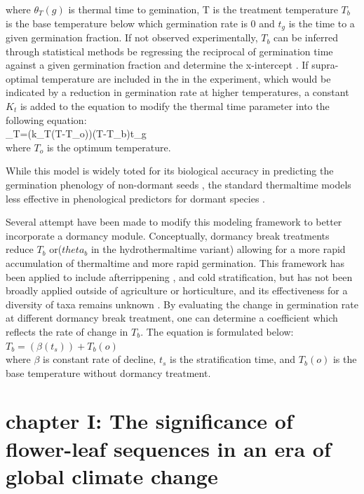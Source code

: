 \documentclass{article}\usepackage[]{graphicx}\usepackage[]{color}
\begin{document}
where $\theta_{T}(g)$ is thermal time to gemination, T is the treatment temperature $T_b$ is the base temperature below which germination rate is 0 and $t_g$ is the time to a given germination fraction. If not observed experimentally, $T_b$ can be inferred through statistical methods be regressing the reciprocal of germination time against a given germination fraction and determine the x-intercept \citep{Pritchard1999}.
If supra-optimal temperature are included in the in the experiment, which would be indicated by a reduction in germination rate at higher temperatures, a constant $K_t$ is added to the equation to modify the thermal time parameter into the following equation:\\

\theta_{T}=(k_{T}(T-T_{o}))(T-T_{b})t_{g}\\

where $T_o$ is the optimum temperature.
\par While this model is widely toted for its biological accuracy in predicting the germination phenology of non-dormant seeds \citep{Bradford2005}, the standard thermaltime models less effective in phenological predictors for dormant species \citep{Batlla2015}.
\par Several attempt have been made to modify this modeling framework to better incorporate a dormancy module. Conceptually, dormancy break treatments reduce $T_b$ or($theta_b$ in the hydrothermaltime variant) allowing for a more rapid accumulation of thermaltime and more rapid germination. This framework has been applied to include afterrippening \citep{Meyer2000}, and cold stratification\citep{Pritchard1996,Batlla2003}, but has not been broadly applied outside of agriculture or horticulture, and its effectiveness for a diversity of taxa remains unknown \citep{Steadman2004}. By evaluating the change in germination rate at different dormancy break treatment, one can determine a coefficient which reflects the rate of change in $T_b$. The equation is formulated below:\\

$T_b= (\beta(t_s))+T_b(o)$\\

where $\beta$ is constant rate of decline, $t_s$ is the stratification time, and $T_b(o)$ is the base temperature without dormancy treatment.

\section*{chapter I: The significance of flower-leaf sequences in an era of global climate change}
\end{document}

